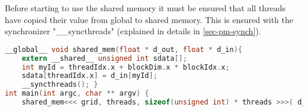 Before starting to use the shared memory it must be ensured that all threads have copied their value from global to shared memory.
This is ensured with the synchronizer "\_\_syncthreads" (explained in details in \autoref{sec-pm-synch}).
\begin{lstlisting}[language=C,caption={Example of using shared memory},label=lst:shared-mem-acc]
__global__ void shared_mem(float * d_out, float * d_in){
	extern __shared__ unsigned int sdata[];
	int myId = threadIdx.x + blockDim.x * blockIdx.x;
	sdata[threadIdx.x] = d_in[myId];
	__syncthreads(); }
int main(int argc, char ** argv) {
	shared_mem<<< grid, threads, sizeof(unsigned int) * threads >>>( d_in, d_out ); }
\end{lstlisting}

